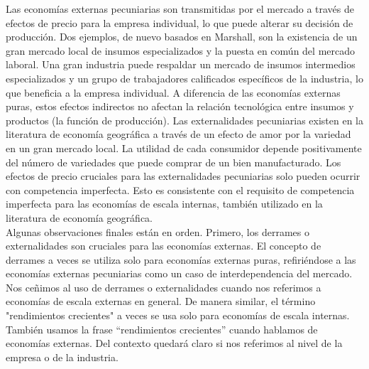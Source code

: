 Las economías externas pecuniarias son transmitidas por el mercado a través de efectos de precio para la empresa individual, lo que puede alterar su decisión de producción. Dos ejemplos, de nuevo basados en Marshall, son la existencia de un gran mercado local de insumos especializados y la puesta en común del mercado laboral. Una gran industria puede respaldar un mercado de insumos intermedios especializados y un grupo de trabajadores calificados específicos de la industria, lo que beneficia a la empresa individual. A diferencia de las economías externas puras, estos efectos indirectos no afectan la relación tecnológica entre insumos y productos (la función de producción). Las externalidades pecuniarias existen en la literatura de economía geográfica a través de un efecto de amor por la variedad en un gran mercado local. La utilidad de cada consumidor depende positivamente del número de variedades que puede comprar de un bien manufacturado. Los efectos de precio cruciales para las externalidades pecuniarias solo pueden ocurrir con competencia imperfecta. Esto es consistente con el requisito de competencia imperfecta para las economías de escala internas, también utilizado en la literatura de economía geográfica.\\
Algunas observaciones finales están en orden. Primero, los derrames o externalidades son cruciales para las economías externas. El concepto de derrames a veces se utiliza solo para economías externas puras, refiriéndose a las economías externas pecuniarias como un caso de interdependencia del mercado. Nos ceñimos al uso de derrames o externalidades cuando nos referimos a economías de escala externas en general. De manera similar, el término "rendimientos crecientes" a veces se usa solo para economías de escala internas. También usamos la frase “rendimientos crecientes” cuando hablamos de economías externas. Del contexto quedará claro si nos referimos al nivel de la empresa o de la industria.\\

